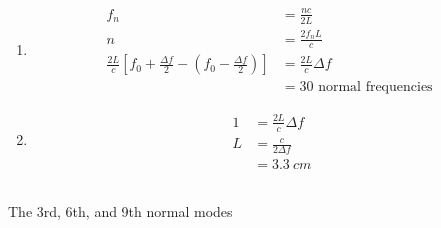 \documentclass{article}
\begin{document}
\subsection{}

\begin{enumerate}
  \item

        \begin{align*}
          f_n                                                                                             & = \frac{n c}{2 L}                \\
          n                                                                                               & = \frac{2 f_n L}{c}              \\
          \frac{2 L}{c} \left[ f_0 + \frac{\Delta f}{2} - \left( f_0 - \frac{\Delta f}{2} \right) \right] & = \frac{2 L}{c} \Delta f         \\
                                                                                                          & = 30 \text{ normal frequencies }
        \end{align*}

  \item

        \begin{align*}
          1 & = \frac{2 L}{c} \Delta f \\
          L & = \frac{c}{2 \Delta f}   \\
            & = \qty{3.3}{cm}
        \end{align*}
\end{enumerate}

\subsection{}

The 3rd, 6th, and 9th normal modes

\subsection{}
\end{document}
